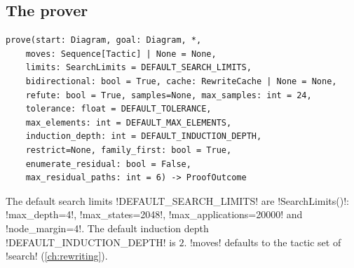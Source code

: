 \subsection{The prover}

\begin{signature}
\begin{lstlisting}[style=python,frame=none]
prove(start: Diagram, goal: Diagram, *,
    moves: Sequence[Tactic] | None = None,
    limits: SearchLimits = DEFAULT_SEARCH_LIMITS,
    bidirectional: bool = True, cache: RewriteCache | None = None,
    refute: bool = True, samples=None, max_samples: int = 24,
    tolerance: float = DEFAULT_TOLERANCE,
    max_elements: int = DEFAULT_MAX_ELEMENTS,
    induction_depth: int = DEFAULT_INDUCTION_DEPTH,
    restrict=None, family_first: bool = True,
    enumerate_residual: bool = False,
    max_residual_paths: int = 6) -> ProofOutcome
\end{lstlisting}
\end{signature}

\begin{sloppypar}
The default search limits \py!DEFAULT_SEARCH_LIMITS! are \py!SearchLimits()!: \py!max_depth=4!, \py!max_states=2048!, \py!max_applications=20000! and \py!node_margin=4!. The default induction depth \py!DEFAULT_INDUCTION_DEPTH! is $2$. \py!moves! defaults to the tactic set of \py!search! (\cref{ch:rewriting}).
\end{sloppypar}

